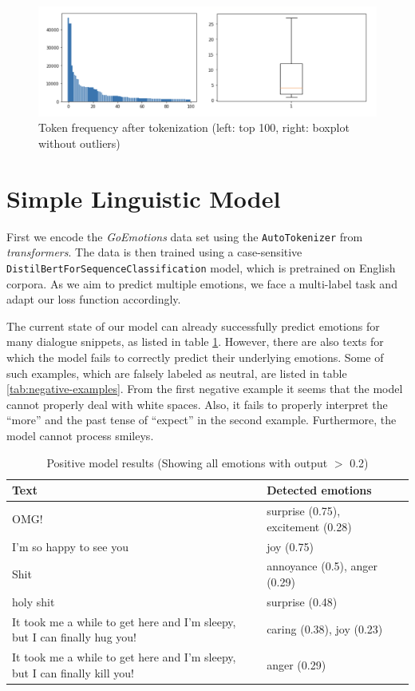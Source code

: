 \documentclass[a4paper]{article}
\begin{document}
\begin{figure}[H]
\centering
\includegraphics[width=15cm]{tokens}
\caption{Token frequency after tokenization (left: top 100, right: boxplot without outliers)}
\label{fig:tokens}
\end{figure}


\section{Simple Linguistic Model}

First we encode the \textit{GoEmotions} data set using the \texttt{AutoTokenizer} from \textit{transformers}. The data is then trained using a case-sensitive  \texttt{DistilBertForSequenceClassification} model, which is pretrained on English corpora. As we aim to predict multiple emotions, we face a multi-label task and adapt our loss function accordingly.

The current state of our model can already successfully predict emotions for many dialogue snippets, as listed in table \ref{tab:positive-examples}. However, there are also texts for which the model fails to correctly predict their underlying emotions. Some of such examples, which are falsely labeled as neutral, are listed in table \ref{tab:negative-examples}. From the first negative example it seems that the model cannot properly deal with white spaces. Also, it fails to properly interpret the ``more'' and the past tense of ``expect'' in the second example. Furthermore, the model cannot process smileys. 

\begin{table}[h]
\begin{center}
\begin{tabular}{ l l l } 
\hline
Text & Detected emotions\\
\hline
OMG! & surprise (0.75), excitement (0.28)\\ 
I'm so happy to see you & joy (0.75)\\ 
Shit & annoyance (0.5), anger (0.29)\\ 
holy shit & surprise (0.48)\\ 
It took me a while to get here and I'm sleepy, but I can finally hug you! & caring (0.38), joy (0.23)\\ 
It took me a while to get here and I'm sleepy, but I can finally kill you! & anger (0.29)\\ 
\hline
\end{tabular}
\caption{\label{tab:positive-examples}Positive model results (Showing all emotions with output $>$ 0.2)}
\end{center}
\end{table}
\end{document}
